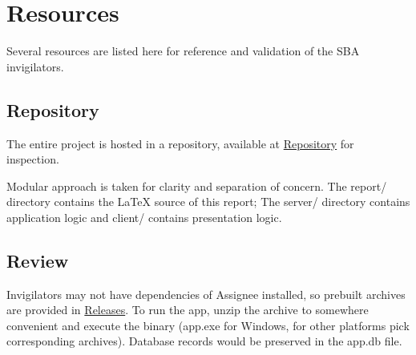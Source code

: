 \section{Resources}
\label{overview.src}

Several resources are listed here for reference and validation of the SBA
invigilators.

\subsection{Repository}
\label{overview.src.repo}

The entire project is hosted in a repository, available at
\href{https://github.com/wavim/assignee}{Repository} for inspection.

Modular approach is taken for clarity and separation of concern. The report/
directory contains the \LaTeX{} source of this report; The server/ directory contains
application logic and client/ contains presentation logic.

\subsection{Review}
\label{overview.src.review}

Invigilators may not have dependencies of Assignee installed, so prebuilt
archives are provided in
\href{https://github.com/wavim/assignee/releases}{Releases}. To run the app,
unzip the archive to somewhere convenient and execute the binary (app.exe for Windows,
for other platforms pick corresponding archives). Database records would be
preserved in the app.db file.